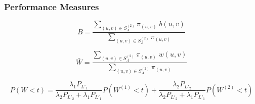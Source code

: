 \begin{frame}
    \frametitle{Performance Measures}
    \centering
    \small

    \begin{equation*}
        \bar{B} = \frac{\sum_{(u,v) \in S_A^{(2)}} \pi_{(u,v)} \; 
        b(u,v)}{\sum_{(u,v) \in S_A^{(2)}} \pi_{(u,v)}}
    \end{equation*}

    \begin{equation*}
        \bar{W} = \frac{\sum_{(u,v) \in S_A^{(2)}} \pi_{(u,v)} \; 
        w(u,v)}{\sum_{(u,v) \in S_A^{(2)}} \pi_{(u,v)}}
    \end{equation*}
    
    \begin{equation*}
        P(W < t) = \frac{\lambda_1 P_{L'_1}}{\lambda_2 P_{L'_2}+\lambda_1 P_{L'_1}} 
        P(W^{(1)} < t) + \frac{\lambda_2 P_{L'_2}}{\lambda_2 P_{L'_2} + 
        \lambda_1 P_{L'_1}}P(W^{(2)} < t) 
    \end{equation*}
\end{frame}


